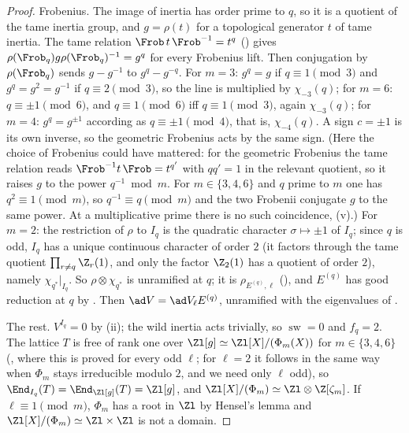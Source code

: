 \begin{proof}
Frobenius. The image of inertia has order prime to $q$, so it is a quotient of the tame inertia group, and $g=\rho(t)$ for a topological
generator $t$ of tame inertia. The tame relation $\Frob\,t\,\Frob^{-1}=t^q$ () gives $\rho(\Frob_q)g\rho(\Frob_q)^{-1}=g^q$ for every Frobenius lift.
Then conjugation by $\rho(\Frob_q)$ sends $g-g^{-1}$ to $g^q-g^{-q}$. For $m=3$: $g^q=g$ if $q\equiv1\pmod3$ and $g^q=g^2=g^{-1}$ if $q\equiv2\pmod3$, so the line is
multiplied by $\chi_{-3}(q)$; for $m=6$: $q\equiv\pm1\pmod6$, and $q\equiv1\pmod6$ iff $q\equiv1\pmod3$, again $\chi_{-3}(q)$; for $m=4$: $g^q=g^{\pm1}$ according as
$q\equiv\pm1\pmod4$, that is, $\chi_{-4}(q)$. A sign $c=\pm1$ is its own inverse, so the geometric Frobenius acts by the same sign. (Here the choice of
Frobenius could have mattered: for the geometric Frobenius the tame relation reads $\Frob^{-1}t\,\Frob=t^{q'}$ with $qq'=1$ in the relevant quotient, so it raises $g$
to the power $q^{-1}\bmod m$. For $m\in\{3,4,6\}$ and $q$ prime to $m$ one has $q^2\equiv1\pmod m$, so $q^{-1}\equiv q\pmod m$ and the two Frobenii conjugate $g$ to the same
power. At a multiplicative prime there is no such coincidence, (v).) For $m=2$: the
restriction of $\rho$ to $I_q$ is the quadratic character $\sigma\mapsto\pm1$ of $I_q$; since $q$ is odd, $I_q$ has a unique continuous character of order
$2$ (it factors through the tame quotient $\prod_{r\ne q}\Z_r(1)$, and only the factor $\Z_2(1)$ has a quotient of order $2$), namely
$\chi_{q^*}|_{I_q}$. So $\rho\otimes\chi_{q^*}$ is unramified at $q$; it is $\rho_{E^{(q)},\ell}$ (), and $E^{(q)}$ has good
reduction at $q$ by . Then $\ad V=\ad V_\ell E^{(q)}$, unramified with the eigenvalues of .

The rest. $V^{I_q}=0$ by (ii); the wild inertia acts trivially, so $\operatorname{sw}=0$ and $f_q=2$. The lattice $T$ is free of rank
one over $\Zl[g]\simeq\Zl[X]/(\Phi_m(X))$ for $m\in\{3,4,6\}$ (, where this is proved for every odd $\ell$; for $\ell=2$ it follows in the
same way when $\Phi_m$ stays irreducible modulo $2$, and we need only $\ell$ odd), so $\End_{I_q}(T)=\End_{\Zl[g]}(T)=\Zl[g]$, and
$\Zl[X]/(\Phi_m)\simeq\Zl\otimes\Z[\zeta_m]$. If $\ell\equiv1\pmod m$, $\Phi_m$ has a root in $\Zl$ by Hensel's lemma and $\Zl[X]/(\Phi_m)\simeq\Zl\times\Zl$ is not a domain.
\end{proof}

